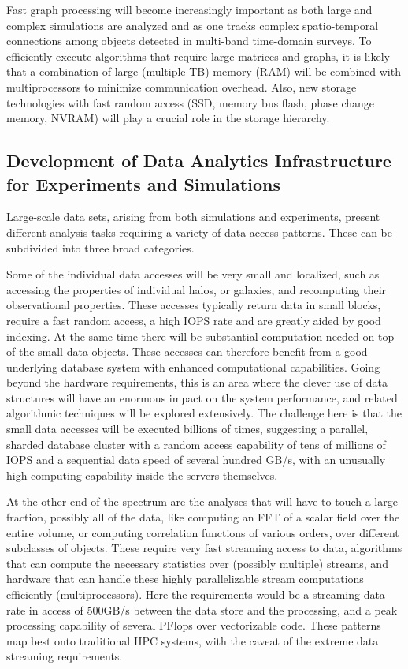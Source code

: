 Fast graph processing will become increasingly important as both large
and complex simulations are analyzed and as one tracks complex
spatio-temporal connections among objects detected in multi-band
time-domain surveys. To efficiently execute algorithms that require
large matrices and graphs, it is likely that a combination of large
(multiple TB) memory (RAM) will be combined with multiprocessors to
minimize communication overhead. Also, new storage technologies with
fast random access (SSD, memory bus flash, phase change memory, NVRAM)
will play a crucial role in the storage hierarchy.

\subsection{Development of Data Analytics Infrastructure for
  Experiments and Simulations}

Large-scale data sets, arising from both simulations and experiments,
present different analysis tasks requiring a variety of data access
patterns. These can be subdivided into three broad categories.

Some of the individual data accesses will be very small and localized,
such as accessing the properties of individual halos, or galaxies, and
recomputing their observational properties. These accesses typically
return data in small blocks, require a fast random access, a high IOPS
rate and are greatly aided by good indexing. At the same time there
will be substantial computation needed on top of the small data
objects. These accesses can therefore benefit from a good underlying
database system with enhanced computational capabilities. Going beyond
the hardware requirements, this is an area where the clever use of
data structures will have an enormous impact on the system
performance, and related algorithmic techniques will be explored
extensively. The challenge here is that the small data accesses will
be executed billions of times, suggesting a parallel, sharded database
cluster with a random access capability of tens of millions of IOPS
and a sequential data speed of several hundred GB/s, with an unusually
high computing capability inside the servers themselves.

At the other end of the spectrum are the analyses that will have to
touch a large fraction, possibly all of the data, like computing an
FFT of a scalar field over the entire volume, or computing correlation
functions of various orders, over different subclasses of
objects. These require very fast streaming access to data, algorithms
that can compute the necessary statistics over (possibly multiple)
streams, and hardware that can handle these highly parallelizable
stream computations efficiently (multiprocessors). Here the
requirements would be a streaming data rate in access of 500GB/s
between the data store and the processing, and a peak processing
capability of several PFlops over vectorizable code. These patterns
map best onto traditional HPC systems, with the caveat of the extreme
data streaming requirements.

